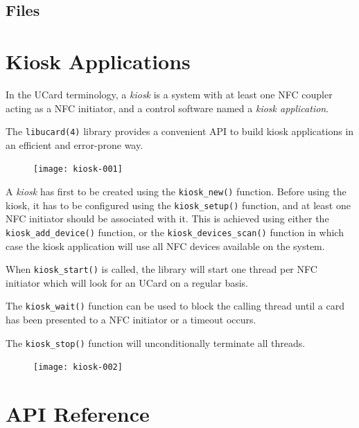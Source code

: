 \documentclass{article}
\begin{document}
\subsection{Files}

\section{Kiosk Applications}

In the UCard terminology, a \emph{kiosk} is a system with at least one
NFC coupler acting as a NFC initiator, and a control software named a
\emph{kiosk application}.

The \texttt{libucard(4)} library provides a convenient API to build
kiosk applications in an efficient and error-prone way.

\begin{figure}[hp]
	\centering
  \texttt{[image: kiosk-001]}
\end{figure}

A \emph{kiosk} has first to be created using the
\texttt{kiosk\_new()} function.  Before using the kiosk, it has to be
configured using the \texttt{kiosk\_setup()} function, and at least
one NFC initiator should be associated with it. This is achieved using
either the \texttt{kiosk\_add\_device()} function, or the
\texttt{kiosk\_devices\_scan()} function in which case the kiosk
application will use all NFC devices available on the system.

When \texttt{kiosk\_start()} is called, the library will start one
thread per NFC initiator which will look for an UCard on a regular
basis.

The \texttt{kiosk\_wait()} function can be used to block the calling
thread until a card has been presented to a NFC initiator or a timeout
occurs.

The \texttt{kiosk\_stop()} function will unconditionally terminate all
threads.


\begin{figure}[hp]
	\centering
  \texttt{[image: kiosk-002]}
\end{figure}


\section{API Reference}
\end{document}
